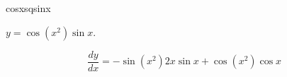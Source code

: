 \begin{defproblem}{cosxsqsinx}%
\begin{onlyproblem}%
$y = \cos(x^2)\sin x$.%
\end{onlyproblem}%
\begin{onlysolution}%
\[\frac{dy}{dx} = -\sin(x^2)2x\sin x + \cos(x^2)\cos x\]
\end{onlysolution}%
\end{defproblem}